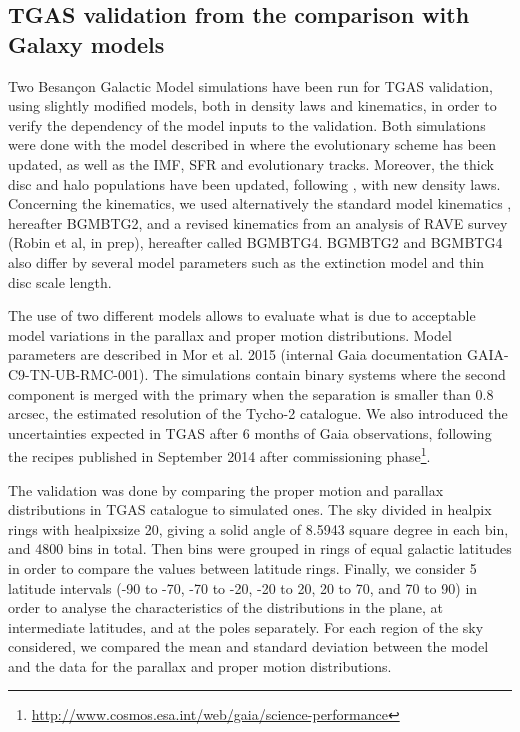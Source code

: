 \subsection{TGAS validation from the comparison with Galaxy models}

Two Besan\c{c}on Galactic Model simulations have been run for TGAS validation, using slightly modified models, both in density laws and kinematics, in order to verify the dependency of the model inputs to the validation. Both simulations were done with the model described in \cite{2014A&A...564A.102C} where the evolutionary scheme has been updated, as well as the IMF, SFR and evolutionary tracks. Moreover, the thick disc and halo populations have been updated, following \cite{2014A&A...569A..13R}, with new density laws. Concerning the kinematics, we used alternatively the standard model kinematics \citep{bgm}, hereafter BGMBTG2, and a revised kinematics from an analysis of RAVE survey (Robin et al, in prep), hereafter called BGMBTG4. BGMBTG2 and BGMBTG4 also differ by several model parameters such as the extinction model and thin disc scale length. 

The use of two different models allows to evaluate what is due to acceptable model variations in the parallax and proper motion distributions. Model parameters are described in Mor et al. 2015 (internal Gaia documentation GAIA-C9-TN-UB-RMC-001). The simulations contain binary systems where the second component is merged with the primary when the separation is smaller than 0.8 arcsec, the estimated resolution of the Tycho-2 catalogue. We also introduced the uncertainties expected in TGAS after 6 months of Gaia observations, following the recipes published in September 2014 after commissioning phase\footnote{\scriptsize\url{http://www.cosmos.esa.int/web/gaia/science-performance}}.

The validation was done by comparing the proper motion and parallax distributions in TGAS catalogue to simulated ones. The sky  divided in healpix rings with healpixsize 20, giving a solid angle of 8.5943 square degree in each bin, and 4800 bins in total. Then bins were grouped in rings of equal galactic latitudes in order to compare the values between latitude rings. Finally, we consider 5 latitude intervals (-90 to -70\deg, -70 to -20\deg, -20 to 20\deg, 20 to 70\deg, and 70 to 90\deg) in order to analyse the characteristics of the distributions in the plane, at intermediate latitudes, and at the poles separately. For each region of the sky considered, we compared the mean and standard deviation between the model and the data for the parallax and proper motion distributions. 

